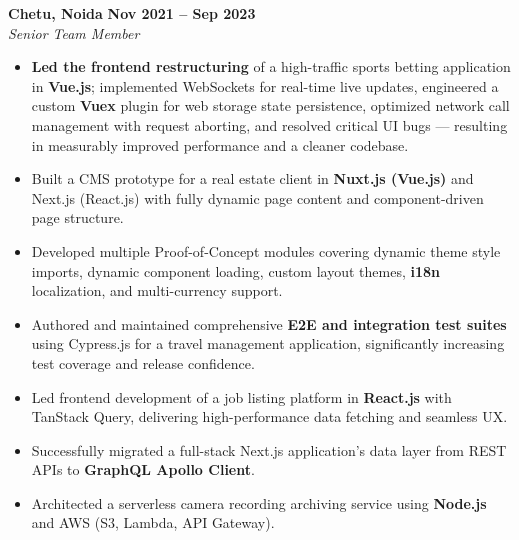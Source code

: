 \documentclass[a4paper,10pt]{article}
\begin{document}
\vspace{1ex}
\noindent
\textbf{Chetu, Noida} \hfill \textbf{Nov 2021 -- Sep 2023} \\
\textit{Senior Team Member}
\begin{itemize}[leftmargin=*,itemsep=2pt,parsep=0pt]
    \item \textbf{Led the frontend restructuring} of a high-traffic sports betting application in \textbf{Vue.js}; implemented WebSockets for real-time live updates, engineered a custom \textbf{Vuex} plugin for web storage state persistence, optimized network call management with request aborting, and resolved critical UI bugs --- resulting in measurably improved performance and a cleaner codebase.
    \item Built a CMS prototype for a real estate client in \textbf{Nuxt.js (Vue.js)} and Next.js (React.js) with fully dynamic page content and component-driven page structure.
    \item Developed multiple Proof-of-Concept modules covering dynamic theme style imports, dynamic component loading, custom layout themes, \textbf{i18n} localization, and multi-currency support.
    \item Authored and maintained comprehensive \textbf{E2E and integration test suites} using Cypress.js for a travel management application, significantly increasing test coverage and release confidence.
    \item Led frontend development of a job listing platform in \textbf{React.js} with TanStack Query, delivering high-performance data fetching and seamless UX.
    \item Successfully migrated a full-stack Next.js application's data layer from REST APIs to \textbf{GraphQL Apollo Client}.
    \item Architected a serverless camera recording archiving service using \textbf{Node.js} and AWS (S3, Lambda, API Gateway).
\end{itemize}
\end{document}
